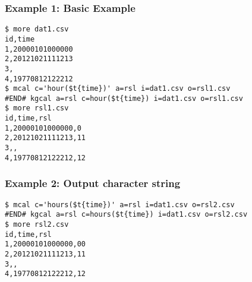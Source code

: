 \subsubsection*{Example 1: Basic Example}



\begin{Verbatim}[baselinestretch=0.7,frame=single]
$ more dat1.csv
id,time
1,20000101000000
2,20121021111213
3,
4,19770812122212
$ mcal c='hour($t{time})' a=rsl i=dat1.csv o=rsl1.csv
#END# kgcal a=rsl c=hour($t{time}) i=dat1.csv o=rsl1.csv
$ more rsl1.csv
id,time,rsl
1,20000101000000,0
2,20121021111213,11
3,,
4,19770812122212,12
\end{Verbatim}
\subsubsection*{Example 2: Output character string}



\begin{Verbatim}[baselinestretch=0.7,frame=single]
$ mcal c='hours($t{time})' a=rsl i=dat1.csv o=rsl2.csv
#END# kgcal a=rsl c=hours($t{time}) i=dat1.csv o=rsl2.csv
$ more rsl2.csv
id,time,rsl
1,20000101000000,00
2,20121021111213,11
3,,
4,19770812122212,12
\end{Verbatim}

